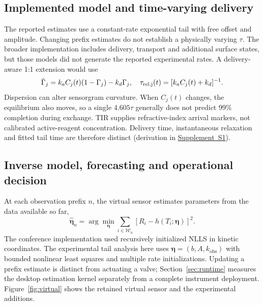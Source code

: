 \documentclass[lettersize,journal]{IEEEtran}
\newcommand{\supp}[1]{\href{SPR_smart_stop_supplement.pdf}{Supplement~#1}}
\begin{document}
\subsection{Implemented model and time-varying delivery}
The reported estimates use a constant-rate exponential tail with free
offset and amplitude. Changing prefix estimates do not establish a
physically varying $\tau$. The broader implementation includes delivery,
transport and additional surface states, but those models did not generate
the reported experimental rates. A delivery-aware 1:1 extension would use
\begin{equation}
 \dot\Gamma_j=k_aC_j(t)(1-\Gamma_j)-k_d\Gamma_j,
 \quad \tau_{\rm rel,j}(t)=[k_aC_j(t)+k_d]^{-1}.
\end{equation}
Dispersion can alter sensorgram curvature\cite{quinn2019}. When $C_j(t)$
changes, the equilibrium also moves, so a single $4.605\tau$ generally
does not predict 99\% completion during exchange. TIR supplies
refractive-index arrival markers, not calibrated active-reagent
concentration. Delivery time, instantaneous relaxation and fitted tail
time are therefore distinct (derivation in \supp{S1}).

\subsection{Inverse model, forecasting and operational decision}
At each observation prefix $n$, the virtual sensor estimates parameters
from the data available so far,
\begin{equation}
 \widehat{\boldsymbol\eta}_n
 =\arg\min_{\boldsymbol\eta}\sum_{i\in\mathcal W_n}
 [R_i-h(T_i;\boldsymbol\eta)]^2.
\end{equation}
The conference implementation used recursively initialized NLLS in kinetic
coordinates. The experimental tail analysis here uses
$\boldsymbol\eta=(b,A,k_{\mathrm{obs}})$ with bounded nonlinear least squares
and multiple rate initializations. Updating a prefix estimate is distinct
from actuating a valve; Section~\ref{sec:runtime} measures the desktop
estimation kernel separately from a complete instrument deployment. Figure~\ref{fig:virtual} shows the retained virtual
sensor and the experimental additions.
\end{document}
